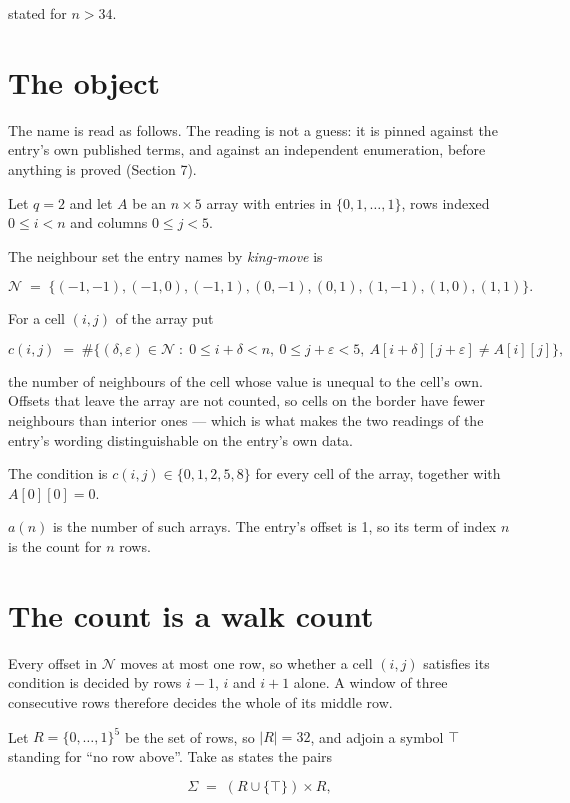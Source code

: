 \documentclass[11pt]{article}
\theoremstyle{definition}
\begin{document}
stated for $n > 34$.

\section{The object}

The name is read as follows. The reading is not a guess: it is pinned against the entry's own published terms, and against an independent enumeration, before anything is proved (Section 7).

Let $q = 2$ and let $A$ be an $n \times 5$ array with entries in $\{0,1,\dots,1\}$, rows indexed $0 \le i < n$ and columns $0 \le j < 5$.

The neighbour set the entry names by {\itshape king-move} is

\[\mathcal{N} \;=\; \{(-1,-1), (-1,0), (-1,1), (0,-1), (0,1), (1,-1), (1,0), (1,1)\}.\]

For a cell $(i,j)$ of the array put

\[c(i,j) \;=\; \#\bigl\{(\delta,\varepsilon)\in\mathcal{N} \;:\; 0\le i+\delta<n,\ 0\le j+\varepsilon<5,\ A[i+\delta][j+\varepsilon] \neq A[i][j]\bigr\},\]

the number of neighbours of the cell whose value is unequal to the cell's own. Offsets that leave the array are not counted, so cells on the border have fewer neighbours than interior ones --- which is what makes the two readings of the entry's wording distinguishable on the entry's own data.

The condition is $c(i,j) \in \{0, 1, 2, 5, 8\}$ for every cell of the array, together with $A[0][0]=0$.

$a(n)$ is the number of such arrays. The entry's offset is 1, so its term of index $n$ is the count for $n$ rows.

\section{The count is a walk count}

Every offset in $\mathcal{N}$ moves at most one row, so whether a cell $(i,j)$ satisfies its condition is decided by rows $i-1$, $i$ and $i+1$ alone. A window of three consecutive rows therefore decides the whole of its middle row.

Let $R = \{0,\dots,1\}^{5}$ be the set of rows, so $|R| = 32$, and adjoin a symbol $\top$ standing for ``no row above''. Take as states the pairs

\[\Sigma \;=\; (R \cup \{\top\}) \times R,\]
\end{document}
